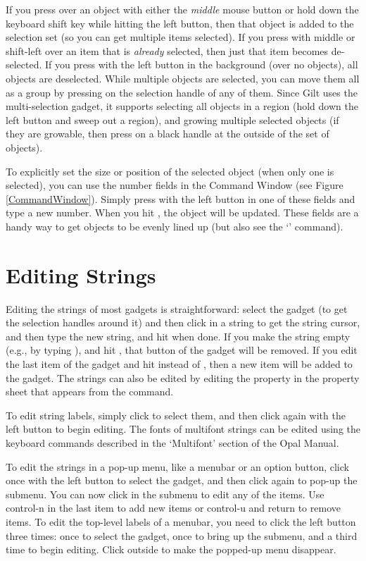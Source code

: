 If you press over an object with either the {\it middle} mouse button or
hold down the keyboard shift key while hitting the left button, then
that object is added to the selection set (so
you can get multiple items selected).  If you press with middle or
shift-left over an item that is {\it already} selected, then just that item
becomes de-selected.  If you press with the left button in the
background (over no objects), all objects are deselected.  While
multiple objects are selected, you can move them all as a group by
pressing on the selection handle of any of them.
Since Gilt uses the multi-selection gadget, it supports selecting
all objects in a region (hold down the left button and sweep out a
region), and growing multiple selected objects (if they are growable,
then press on a black handle at the outside of the set of objects).

To explicitly set the size or position of the selected object (when
only one is selected), you can use
the number fields in the Command Window (see Figure \ref{CommandWindow}).
Simply press with the left button in one of these fields and type a new
number.  When you hit , the object will be updated.  These fields
are a handy way to get objects to be evenly lined up (but also see the
`' command).


\section{Editing Strings}

Editing the strings of most gadgets is straightforward: select the
gadget (to get the selection handles around it) and then click in a
string to get the string cursor, and then type the new string, and hit
 when done.  If you make the string empty (e.g., by typing
),
and hit , that button of the gadget will be removed.  If you
edit the last item of the gadget and hit  instead of ,
then a new item will be added to the gadget.  The strings can also be
edited by editing the  property in the property sheet that
appears from the  command.

To edit string labels, simply click to select them, and then click
again with the left button to begin editing.  The fonts of
multifont strings can be edited using the keyboard commands described
in the `Multifont' section of the Opal Manual.

To edit the strings in a pop-up menu, like a menubar or an option
button, click once with the left button to select the gadget, and then
click again to pop-up the submenu.  You can now click in the submenu
to edit any of the items.  Use control-n in the last item to add new
items or control-u and return to remove items.  To edit the top-level
labels of a menubar, you need to click the left button three times:
once to select the gadget, once to bring up the submenu, and a third
time to begin editing.  Click outside to make the popped-up menu
disappear.

